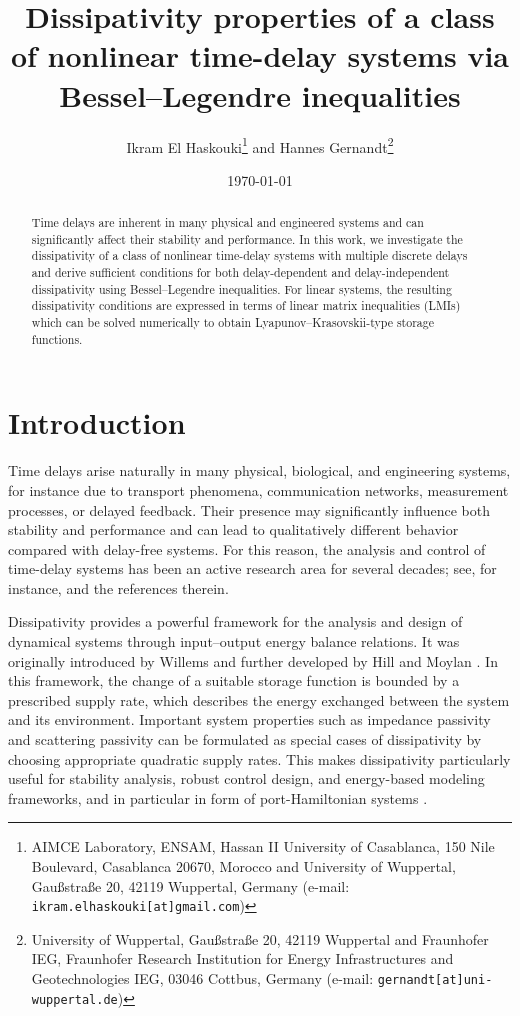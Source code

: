 \documentclass[12pt]{article}
\title{Dissipativity properties of a class of nonlinear time-delay systems via Bessel--Legendre inequalities}
\author{Ikram El Haskouki\footnote{AIMCE Laboratory, ENSAM, Hassan II University of Casablanca, 150 Nile Boulevard, Casablanca 20670, Morocco and University of Wuppertal, Gaußstraße 20, 42119 Wuppertal, Germany (e-mail: \texttt{ikram.elhaskouki[at]gmail.com})} and Hannes Gernandt\footnote{University of Wuppertal, Gaußstraße 20, 42119 Wuppertal and Fraunhofer IEG, Fraunhofer Research Institution for Energy Infrastructures and Geotechnologies IEG, 03046 Cottbus, Germany  (e-mail: \texttt{gernandt[at]uni-wuppertal.de})} 
}
\date{\today}
\begin{document}
\maketitle

\begin{abstract}
Time delays are inherent in many physical and engineered systems and can significantly affect 
their stability and performance. In this work, we investigate the dissipativity of a class of nonlinear time-delay systems with multiple discrete delays and derive sufficient conditions for both delay-dependent and delay-independent dissipativity using Bessel--Legendre inequalities. For linear systems, the resulting  dissipativity conditions are expressed in terms of linear matrix inequalities (LMIs) which can be solved numerically to obtain Lyapunov--Krasovskii-type storage functions. 
\end{abstract}


\maketitle


\section{Introduction}
\label{sec:introduction}
Time delays arise naturally in many physical, biological, and engineering systems, for instance due to transport phenomena, communication networks, measurement processes, or delayed feedback. Their presence may significantly influence both stability and performance and can lead to qualitatively different behavior compared with delay-free systems. For this reason, the analysis and control of time-delay systems has been an active research area for several decades; see, for instance, \cite{Fridman2014,Scholl2024} and the references therein.

Dissipativity provides a powerful framework for the analysis and design of dynamical systems through input--output energy balance relations. It was originally introduced by Willems \cite{willems1972dissipative} and further developed by Hill and Moylan \cite{hill1976stability}. In this framework, the change of a suitable storage function is bounded by a prescribed supply rate, which describes the energy exchanged between the system and its environment. Important system properties such as impedance passivity and scattering passivity can be formulated as special cases of dissipativity by choosing appropriate quadratic supply rates. This makes dissipativity particularly useful for stability analysis, robust control design, and energy-based modeling frameworks, and in particular in form of port-Hamiltonian systems \cite{Brogliato2007,BreitHU24,haskouki2026delaydependentpassivitystabilitylinear}.
\end{document}
